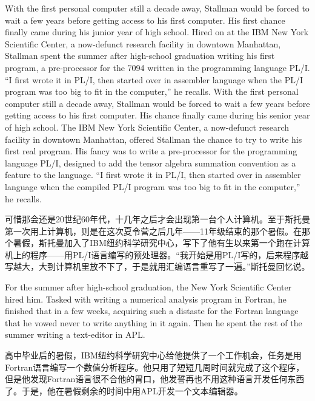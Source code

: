 \ifdefined\eng
\ifdefined\vone
With the first personal computer still a decade away, Stallman would be forced to wait a few years before getting access to his first computer. His first chance finally came during his junior year of high school. Hired on at the IBM New York Scientific Center, a now-defunct research facility in downtown Manhattan, Stallman spent the summer after high-school graduation writing his first program, a pre-processor for the 7094 written in the programming language PL/I. ``I first wrote it in PL/I, then started over in assembler language when the PL/I program was too big to fit in the computer,'' he recalls.
\fi
\ifdefined\vtwo
With the first personal computer still a decade away, Stallman would be forced to wait a few years before getting access to his first computer. His chance finally came during his senior year of high school.  The IBM New York Scientific Center, a now-defunct research facility in downtown Manhattan, offered Stallman the chance to try to write his first real program.  His fancy was to write a pre-processor for the programming language PL/I, designed to add the tensor algebra summation convention as a feature to the language. ``I first wrote it in PL/I, then started over in assembler language when the compiled PL/I program was too big to fit in the computer,'' he recalls.
\fi
\fi

\ifdefined\chs
可惜那会还是20世纪60年代，十几年之后才会出现第一台个人计算机。至于斯托曼第一次用上计算机，则是在这次夏令营之后几年——11年级结束的那个暑假。在那个暑假，斯托曼加入了IBM纽约科学研究中心，写下了他有生以来第一个跑在计算机上的程序——用PL/I语言编写的预处理器。``我开始是用PL/I写的，后来程序越写越大，大到计算机里放不下了，于是就用汇编语言重写了一遍。''斯托曼回忆说。
\fi

\ifdefined\vtwo
\ifdefined\eng
For the summer after high-school graduation, the New York Scientific Center hired him.  Tasked with writing a numerical analysis program in Fortran, he finished that in a few weeks, acquiring such a distaste for the Fortran language that he vowed never to write anything in it again.  Then he spent the rest of the summer writing a text-editor in APL.
\fi

\ifdefined\chs
高中毕业后的暑假，IBM纽约科学研究中心给他提供了一个工作机会，任务是用Fortran语言编写一个数值分析程序。他只用了短短几周时间就完成了这个程序，但是他发现Fortran语言很不合他的胃口，他发誓再也不用这种语言开发任何东西了。于是，他在暑假剩余的时间中用APL开发一个文本编辑器。
\fi
\fi

